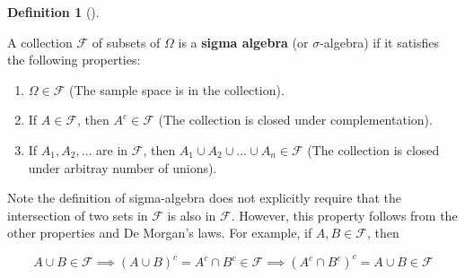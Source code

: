 \documentclass[
  letterpaper,
]{scrbook}
\providecommand{\tightlist}{%
  \setlength{\itemsep}{0pt}\setlength{\parskip}{0pt}}
\theoremstyle{definition}
\newtheorem{definition}{Definition}[chapter]
\theoremstyle{plain}
\theoremstyle{plain}
\theoremstyle{definition}
\theoremstyle{remark}
\begin{document}
\begin{tcolorbox}[enhanced jigsaw, bottomtitle=1mm, coltitle=black, toprule=.15mm, toptitle=1mm, bottomrule=.15mm, colback=white, arc=.35mm, opacityback=0, breakable, title={Sigma Algebra}, titlerule=0mm, rightrule=.15mm, colbacktitle=quarto-callout-note-color!10!white, colframe=quarto-callout-note-color-frame, opacitybacktitle=0.6, leftrule=.75mm, left=2mm]

\begin{definition}[]\protect\hypertarget{def-sigma-algebra}{}\label{def-sigma-algebra}

A collection \(\mathcal{F}\) of subsets of \(\Omega\) is a \textbf{sigma
algebra} (or \(\sigma\)-algebra) if it satisfies the following
properties:

\begin{enumerate}
\def\labelenumi{\arabic{enumi}.}
\tightlist
\item
  \(\Omega \in \mathcal{F}\) (The sample space is in the collection).
\item
  If \(A \in \mathcal{F}\), then \(A^c \in \mathcal{F}\) (The collection
  is closed under complementation).
\item
  If \(A_1, A_2, \dots\) are in \(\mathcal{F}\), then
  \(A_1 \cup A_2 \cup \dots \cup A_n \in \mathcal{F}\) (The collection
  is closed under arbitray number of unions).
\end{enumerate}

\end{definition}

\end{tcolorbox}

Note the definition of sigma-algebra does not explicitly require that
the intersection of two sets in \(\mathcal F\) is also in
\(\mathcal F\). However, this property follows from the other properties
and De Morgan's laws. For example, if \(A,B \in \mathcal F\), then

\[
A\cup B \in \mathcal F \implies (A\cup B)^c = A^c \cap B^c \in \mathcal F \implies (A^c \cap B^c)^c = A \cup B \in \mathcal F
\]
\end{document}
